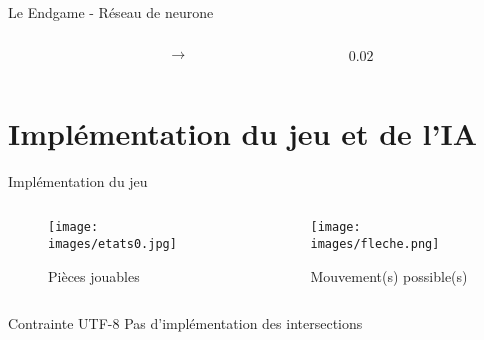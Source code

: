 \documentclass{beamer}
\begin{document}
\begin{frame}{Le Endgame - Réseau de neurone}
\begin{columns}
\begin{column}{0.4\textwidth}
    \end{column}
    \begin{column}{0.1\textwidth}
        \centering
        $\longrightarrow$
    \end{column}
    \begin{column}{0.05\textwidth}
        \centering
        \scriptsize $0.02$
    \end{column}
    \end{columns}
\end{frame}

\section{Implémentation du jeu et de l'IA}

\begin{frame}{Implémentation du jeu}
    \begin{columns}
        \begin{column}{0.5\textwidth}
            \begin{figure}
                \centering
                \texttt{[image: images/etats0.jpg]}
                \caption{Pièces jouables}
                \label{fig:Playable-pieces}
            \end{figure}
        \end{column}
        \begin{column}{0.5\textwidth}
            \begin{figure}
                \centering
                \texttt{[image: images/fleche.png]}
                \caption{Mouvement(s) possible(s)}
                \label{fig:Fleches}
            \end{figure}
        \end{column}
    \end{columns}
    \begin{block}{Contrainte UTF-8}
        Pas d'implémentation des intersections
    \end{block}
\end{frame}
\end{document}
